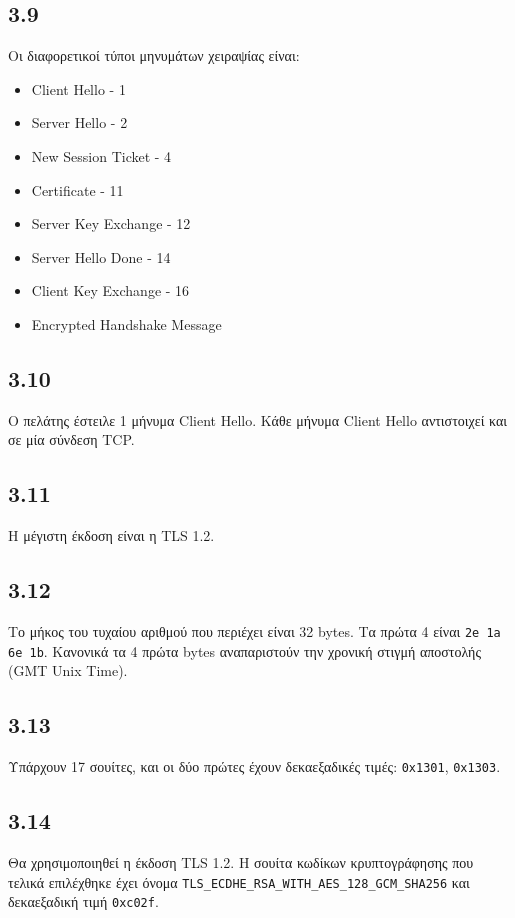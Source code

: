 		\subsection*{3.9}
			Οι διαφορετικοί τύποι μηνυμάτων χειραψίας είναι:
		
			\begin{itemize}
				\item Client Hello - 1
				\item Server Hello - 2
				\item New Session Ticket - 4
				\item Certificate - 11
				\item Server Key Exchange - 12
				\item Server Hello Done - 14
				\item Client Key Exchange - 16
				\item Encrypted Handshake Message
			\end{itemize}

		\subsection*{3.10}
			Ο πελάτης έστειλε 1 μήνυμα Client Hello. Κάθε μήνυμα Client Hello αντιστοιχεί και σε μία σύνδεση TCP.

		\subsection*{3.11}
			Η μέγιστη έκδοση είναι η TLS 1.2.

		\subsection*{3.12}
			Το μήκος του τυχαίου αριθμού που περιέχει είναι 32 bytes. Τα πρώτα 4 είναι \verb|2e 1a 6e 1b|. Κανονικά τα 4 πρώτα bytes αναπαριστούν την χρονική στιγμή αποστολής (GMT Unix Time).

		\subsection*{3.13}
			Υπάρχουν 17 σουίτες, και οι δύο πρώτες έχουν δεκαεξαδικές τιμές: \verb|0x1301|, \verb|0x1303|.

		\subsection*{3.14}
			Θα χρησιμοποιηθεί η έκδοση TLS 1.2. Η σουίτα κωδίκων κρυπτογράφησης που τελικά επιλέχθηκε έχει όνομα \verb|TLS_ECDHE_RSA_WITH_AES_128_GCM_SHA256| και δεκαεξαδική τιμή \verb|0xc02f|.

